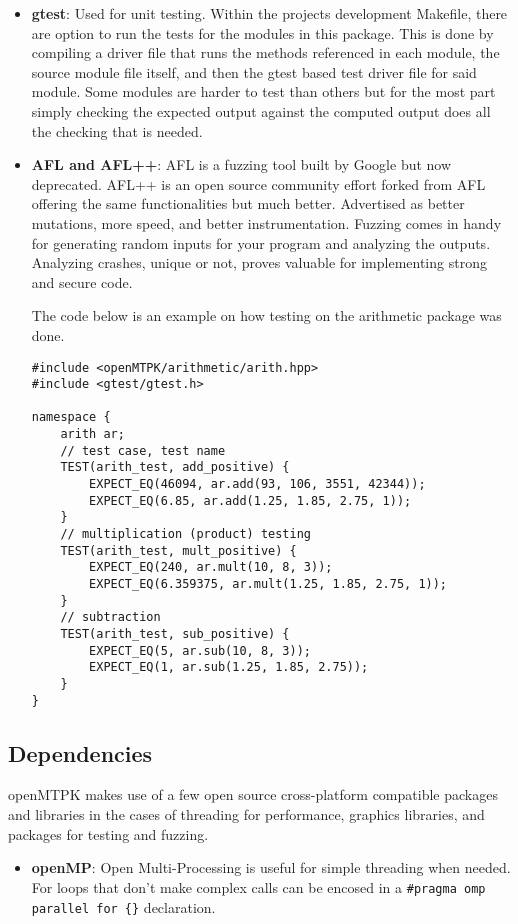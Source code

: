 \documentclass[12pt, letterpaper]{article}
\begin{document}
\begin{sloppypar}
\begin{flushleft}
\begin{itemize}
\item \textbf{gtest}: Used for unit testing. Within the projects development Makefile, 
there are option to run the tests for the modules in this package. This is done by compiling 
a driver file that runs the methods referenced in each module, the source module file itself, 
and then the gtest based test driver file for said module. Some modules are harder to test
than others but for the most part simply checking the expected output against the computed 
output does all the checking that is needed. 

\item \textbf{AFL and AFL++}: AFL is a fuzzing tool built by Google but now deprecated.
AFL++ is an open source community effort forked from AFL offering the same functionalities but 
much better. Advertised as better mutations, more speed, and better instrumentation. Fuzzing 
comes in handy for generating random inputs for your program and analyzing the outputs. 
Analyzing crashes, unique or not, proves valuable for implementing strong and secure code. 

The code below is an example on how testing on the arithmetic package was done.
\begin{lstlisting}
#include <openMTPK/arithmetic/arith.hpp>
#include <gtest/gtest.h>

namespace {
    arith ar;
    // test case, test name
    TEST(arith_test, add_positive) {
        EXPECT_EQ(46094, ar.add(93, 106, 3551, 42344));
        EXPECT_EQ(6.85, ar.add(1.25, 1.85, 2.75, 1));
    }
    // multiplication (product) testing
    TEST(arith_test, mult_positive) {
        EXPECT_EQ(240, ar.mult(10, 8, 3));
        EXPECT_EQ(6.359375, ar.mult(1.25, 1.85, 2.75, 1));
    }
    // subtraction
    TEST(arith_test, sub_positive) {
        EXPECT_EQ(5, ar.sub(10, 8, 3));
        EXPECT_EQ(1, ar.sub(1.25, 1.85, 2.75));
    }
}
\end{lstlisting}

\end{itemize}

\subsection{Dependencies}
openMTPK makes use of a few open source cross-platform compatible packages and libraries
in the cases of threading for performance, graphics libraries, and packages for testing
and fuzzing.
\begin{itemize}
\item \textbf{openMP}: Open Multi-Processing is useful for simple threading when needed.
For loops that don't make complex calls can be encosed in a 
\verb|#pragma omp parallel for {}| declaration.


\end{itemize}
\end{flushleft}
\end{sloppypar}
\end{document}
